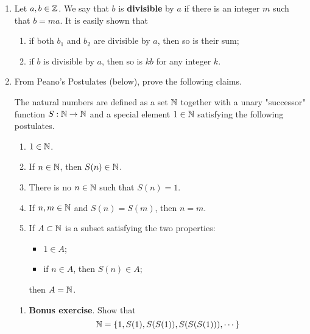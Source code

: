 \documentclass[../main.tex]{subfiles}
\begin{document}
\begin{enumerate}[ref={\thechapter.\arabic*}]
\begin{proof}
\begin{align*}
        \end{align*}
        This closes the induction.
    \end{proof}
    \item \label{axr:0.8}Let $a,b\in\mathbb{Z}$. We say that $b$ is \textbf{divisible} by $a$ if there is an integer $m$ such that $b=ma$. It is easily shown that
    \begin{enumerate}[label={\roman*)},ref={\theenumi-\roman*}]
        \item \label{axr:0.8-i}if both $b_1$ and $b_2$ are divisible by $a$, then so is their sum;
        \item \label{axr:0.8-ii}if $b$ is divisible by $a$, then so is $kb$ for any integer $k$.
    \end{enumerate}
    \item \label{axr:0.9}From Peano's Postulates (below), prove the following claims.
    \begin{axioms}
        The natural numbers are defined as a set $\mathbb{N}$ together with a unary "successor" function $S:\mathbb{N}\to\mathbb{N}$ and a special element $1\in\mathbb{N}$ satisfying the following postulates.
        \begin{enumerate}[label={\Roman*.}]
            \item $1\in\mathbb{N}$.
            \item If $n\in\mathbb{N}$, then $S(n)\in\mathbb{N}$.
            \item There is no $n\in\mathbb{N}$ such that $S(n)=1$.
            \item If $n,m\in\mathbb{N}$ and $S(n)=S(m)$, then $n=m$.
            \item If $A\subset\mathbb{N}$ is a subset satisfying the two properties:
            \begin{itemize}
                \item $1\in A$;
                \item if $n\in A$, then $S(n)\in A$;
            \end{itemize}
            then $A=\mathbb{N}$.
        \end{enumerate}
    \end{axioms}
    \begin{enumerate}[label={(\alph*)},ref={\theenumi\alph*}]
        \item \label{axr:0.9a}\textbf{Bonus exercise}. Show that
        \begin{equation*}
            \mathbb{N} = \{1,S(1),S(S(1)),S(S(S(1))),\cdots\}
        \end{equation*}

\end{enumerate}
\end{enumerate}
\end{document}
